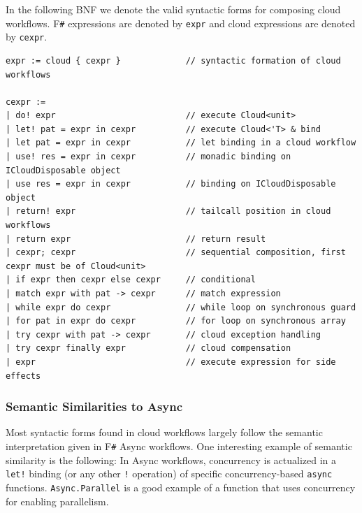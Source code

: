 \documentclass[9pt,a4paper]{article}
\newcommand{\fsharp}{F\texttt \#}
\begin{document}
In the following BNF we denote the valid syntactic forms for composing cloud workflows. 
\fsharp{} expressions are denoted by \texttt{expr} and cloud expressions are denoted by 
\texttt{cexpr}.
\begin{lstlisting}
expr := cloud { cexpr }             // syntactic formation of cloud workflows
 
cexpr :=
| do! expr							// execute Cloud<unit>
| let! pat = expr in cexpr          // execute Cloud<'T> & bind 
| let pat = expr in cexpr           // let binding in a cloud workflow
| use! res = expr in cexpr          // monadic binding on ICloudDisposable object
| use res = expr in cexpr           // binding on ICloudDisposable object
| return! expr                      // tailcall position in cloud workflows
| return expr                       // return result 
| cexpr; cexpr                      // sequential composition, first cexpr must be of Cloud<unit> 
| if expr then cexpr else cexpr     // conditional 
| match expr with pat -> cexpr      // match expression
| while expr do cexpr               // while loop on synchronous guard
| for pat in expr do cexpr          // for loop on synchronous array
| try cexpr with pat -> cexpr       // cloud exception handling
| try cexpr finally expr            // cloud compensation
| expr                              // execute expression for side effects
\end{lstlisting}

\subsubsection*{Semantic Similarities to Async}

Most syntactic forms found in cloud workflows largely follow the semantic interpretation
given in \fsharp{} Async workflows\cite{fsharp-async}. One interesting example of semantic
similarity is the following: In Async workflows, concurrency is actualized in a 
\texttt{let!} binding (or any other \texttt{!} operation) of specific concurrency-based 
\texttt{async} functions. \texttt{Async.Parallel} is a good example of a function that uses 
concurrency for enabling parallelism.
\end{document}
